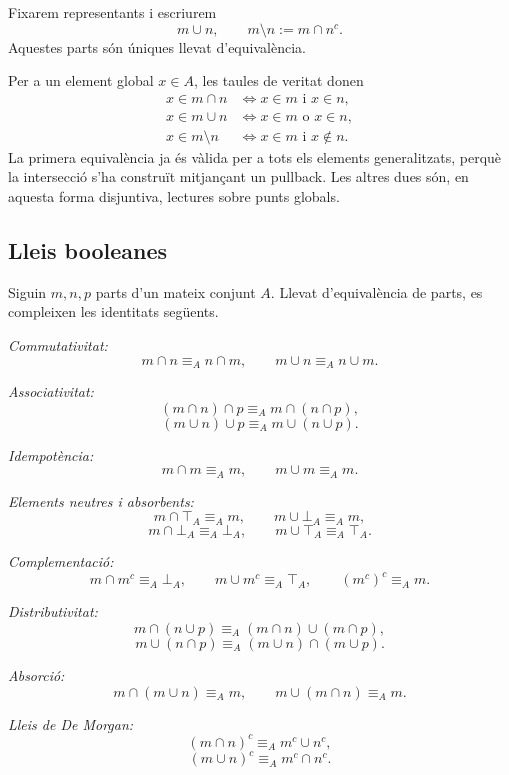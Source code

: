 \begin{notacio}\label{not:operacions-parts}
Fixarem representants i escriurem
\[
m\cup n,
\qquad
m\setminus n:=m\cap n^c.
\]
Aquestes parts són úniques llevat d'equivalència.
\end{notacio}

\begin{observacio}\label{obs:lectura-classica-operacions}
Per a un element global \(x\in A\), les taules de veritat donen
\[
\begin{aligned}
x\in m\cap n
&\Longleftrightarrow x\in m\text{ i }x\in n,\\
x\in m\cup n
&\Longleftrightarrow x\in m\text{ o }x\in n,\\
x\in m\setminus n
&\Longleftrightarrow x\in m\text{ i }x\notin n.
\end{aligned}
\]
La primera equivalència ja és vàlida per a tots els elements
generalitzats, perquè la intersecció s'ha construït mitjançant un
pullback. Les altres dues són, en aquesta forma disjuntiva, lectures
sobre punts globals.
\end{observacio}

\subsection{Lleis booleanes}

\begin{teorema}\label{teo:lleis-booleanes}
Siguin \(m,n,p\) parts d'un mateix conjunt \(A\). Llevat
d'equivalència de parts, es compleixen les identitats següents.

\emph{Commutativitat:}
\[
m\cap n\equiv_A n\cap m,
\qquad
m\cup n\equiv_A n\cup m.
\]

\emph{Associativitat:}
\[
(m\cap n)\cap p\equiv_A m\cap(n\cap p),
\]
\[
(m\cup n)\cup p\equiv_A m\cup(n\cup p).
\]

\emph{Idempotència:}
\[
m\cap m\equiv_A m,
\qquad
m\cup m\equiv_A m.
\]

\emph{Elements neutres i absorbents:}
\[
m\cap\top_A\equiv_A m,
\qquad
m\cup\bot_A\equiv_A m,
\]
\[
m\cap\bot_A\equiv_A\bot_A,
\qquad
m\cup\top_A\equiv_A\top_A.
\]

\emph{Complementació:}
\[
m\cap m^c\equiv_A\bot_A,
\qquad
m\cup m^c\equiv_A\top_A,
\qquad
{(m^c)}^c\equiv_A m.
\]

\emph{Distributivitat:}
\[
m\cap(n\cup p)
\equiv_A
(m\cap n)\cup(m\cap p),
\]
\[
m\cup(n\cap p)
\equiv_A
(m\cup n)\cap(m\cup p).
\]

\emph{Absorció:}
\[
m\cap(m\cup n)\equiv_A m,
\qquad
m\cup(m\cap n)\equiv_A m.
\]

\emph{Lleis de De Morgan:}
\[
(m\cap n)^c\equiv_A m^c\cup n^c,
\]
\[
(m\cup n)^c\equiv_A m^c\cap n^c.
\]
\end{teorema}

